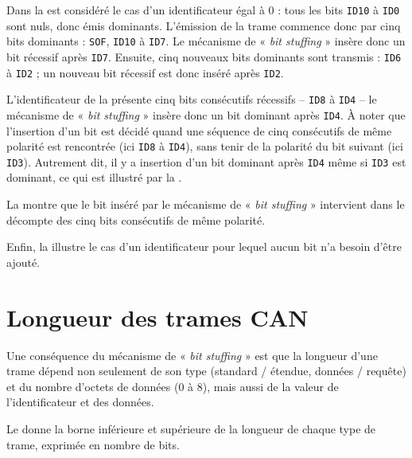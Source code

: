 Dans la  est considéré le cas d'un identificateur égal à $0$ : tous les bits \texttt{ID10} à \texttt{ID0} sont nuls, donc émis dominants. L'émission de la trame commence donc par cinq bits dominants : \texttt{SOF}, \texttt{ID10} à \texttt{ID7}. Le mécanisme de « \emph{bit stuffing} » insère donc un bit récessif après \texttt{ID7}. Ensuite, cinq nouveaux bits dominants sont transmis : \texttt{ID6} à \texttt{ID2} ; un nouveau bit récessif est donc inséré après \texttt{ID2}.

L'identificateur de la  présente cinq bits consécutifs récessifs -- \texttt{ID8} à \texttt{ID4} -- le mécanisme de « \emph{bit stuffing} » insère donc un bit dominant après \texttt{ID4}. À noter que l'insertion d'un bit est décidé quand une séquence de cinq consécutifs de même polarité est rencontrée (ici \texttt{ID8} à \texttt{ID4}), sans tenir de la polarité du bit suivant (ici \texttt{ID3}). Autrement dit, il y a insertion d'un bit dominant après \texttt{ID4} même si \texttt{ID3} est dominant, ce qui est illustré par la .

La  montre que le bit inséré par le mécanisme de « \emph{bit stuffing} » intervient dans le décompte des cinq bits consécutifs de même polarité. 


Enfin, la  illustre le cas d'un identificateur pour lequel aucun bit n'a besoin d'être ajouté.




\section{Longueur des trames CAN}

Une conséquence du mécanisme de « \emph{bit stuffing} » est que la longueur d'une trame dépend non seulement de son type (standard / étendue, données / requête) et du nombre d'octets de données ($0$ à $8$), mais aussi de la valeur de l'identificateur et des données.

Le  donne la borne inférieure et supérieure de la longueur de chaque type de trame, exprimée en nombre de bits.
 
